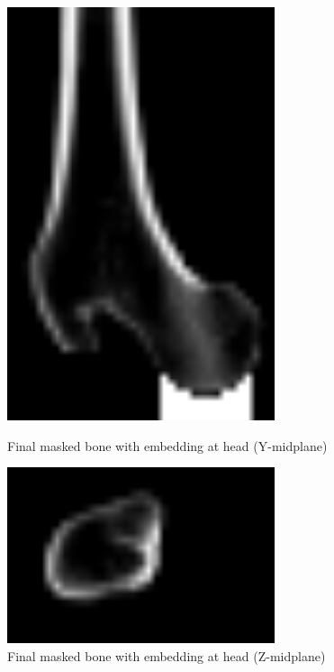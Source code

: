 \documentclass[a4paper,12pt]{article}
\begin{document}
\begin{figure}[htbp]
\begin{minipage}[b]{0.3\textwidth}
            \includegraphics[width=0.7\textwidth]{bone_embedded-YM}
            \caption{Final masked bone with embedding at head (Y-midplane)}
            \label{fig:bone_embedded-YM}
        \end{minipage}
        \hfill
        \begin{minipage}[b]{0.3\textwidth}
            \includegraphics[width=0.7\textwidth]{bone_embedded-ZM}
            \caption{Final masked bone with embedding at head (Z-midplane)}
            \label{fig:bone_embedded-ZM}
        \end{minipage}
    \end{figure}
\end{document}
